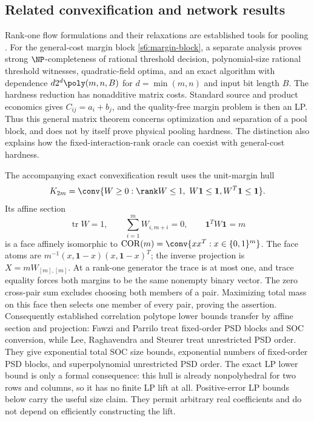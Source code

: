 \subsection{Related convexification and network results}\label{s6:related}
Rank-one flow formulations and their relaxations are established tools
for pooling \cite{dey2020-convexifications-of-rank-one-based,gupte2017-relaxations-and-discretizations-for-the}.
For the general-cost margin block \eqref{s6:margin-block}, a separate
analysis \cite{s6:margin-note} proves strong $\NP$-completeness of
rational threshold decision, polynomial-size rational threshold witnesses,
quadratic-field optima, and an exact algorithm with dependence
$d2^d\poly(m,n,B)$ for $d=\min(m,n)$ and input bit length $B$.
The hardness reduction has nonadditive matrix costs. Standard source
and product economics gives $C_{ij}=a_i+b_j$, and the quality-free
margin problem is then an LP. Thus this general matrix theorem concerns
optimization and separation of a pool block, and does not by itself
prove physical pooling hardness. The distinction also explains how the
fixed-interaction-rank oracle can coexist with general-cost hardness.

The accompanying exact convexification result \cite{s6:face-note}
uses the unit-margin hull
\[
 K_{2m}=\conv\{W\ge0:\rank W\le1,\ W\mathbf1\le\mathbf1,
 W^T\mathbf1\le\mathbf1\}.
\]
Its affine section
\[
 \operatorname{tr}W=1,\qquad\sum_{i=1}^mW_{i,m+i}=0,
 \qquad\mathbf1^TW\mathbf1=m
\]
is a face affinely isomorphic to
$\operatorname{COR}(m)=\conv\{xx^T:x\in\{0,1\}^m\}$.
The face atoms are
$m^{-1}(x,\mathbf1-x)(x,\mathbf1-x)^T$; the inverse projection is
$X=mW_{[m],[m]}$. At a rank-one generator the trace is at most one,
and trace equality forces both margins to be the same nonempty binary
vector. The zero cross-pair sum excludes choosing both members of a
pair. Maximizing total mass on this face then selects one member of
every pair, proving the assertion. Consequently established correlation
polytope lower bounds transfer by affine section and projection:
Fawzi and Parrilo \cite[Theorem~1]{s6:fawzi2013} treat fixed-order PSD
blocks and SOC conversion, while Lee, Raghavendra and Steurer
\cite[Theorem~1.1]{s6:lrs-full} treat unrestricted PSD order.
They give exponential total SOC size bounds, exponential numbers of
fixed-order PSD blocks, and superpolynomial unrestricted PSD order.
The exact LP lower bound is only a formal consequence: this hull is
already nonpolyhedral for two rows and columns, so it has no finite LP
lift at all. Positive-error LP bounds below carry the useful size claim. They permit arbitrary real coefficients and do not depend
on efficiently constructing the lift.

